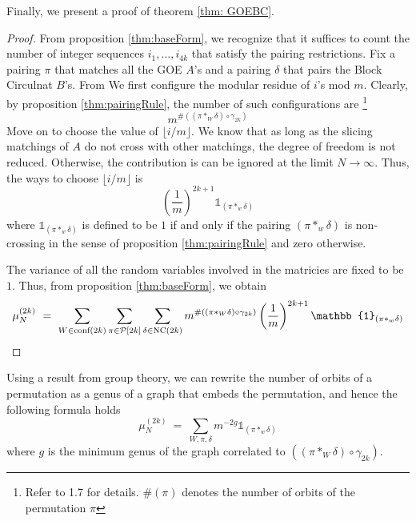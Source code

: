 \documentclass[12pt,reqno]{amsart}
\theoremstyle{plain} %
\theoremstyle{remark}
\theoremstyle{definition}
\begin{document}
Finally, we present a proof of theorem \ref{thm: GOEBC}.
\begin{proof} 
    From proposition \ref{thm:baseForm}, we recognize that 
    it suffices to count the number of integer sequences 
    $i_1, \dots, i_{4k}$ that satisfy the pairing restrictions. 
    Fix a pairing $\pi$ that matches all the GOE $A$'s and a
    pairing $\delta$  that pairs the Block Circulnat $B$'s. 
    From 
    We first configure the modular residue of $i$'s mod $m$. 
    Clearly, by proposition \ref{thm:pairingRule}, the number of such configurations are \footnote{Refer to \cite{MS} 1.7 for details. $\#(\pi)$ denotes the number of orbits of the permutation $\pi$} 
    \[
    m^{
        \# ((\pi *_W \delta)\circ \gamma_{2k})
    }
    \]
    Move on to 
    choose the value of $\lfloor i / m \rfloor$. 
    We know that as long as the slicing matchings of $A$ do 
    not cross with other matchings, the degree of freedom 
    is not reduced. Otherwise, the contribution is can be ignored 
    at the limit $N \rightarrow \infty$. Thus, the ways to choose 
$\lfloor i / m \rfloor$ is 
\begin{equation}
        \left(
            \frac 1 m
        \right)^{2k + 1}
        \mathbb{1}_{(\pi*_w\delta)}
\end{equation}
where $\mathbb{1}_{(\pi*_w\delta)}$ is defined to be $1$ if and only if 
the pairing $(\pi*_w\delta)$ is non-crossing in the sense of proposition 
\ref{thm:pairingRule} and zero otherwise. 

The variance of all the random variables involved in the matricies are 
fixed to be $1$. Thus, from proposition \ref{thm:baseForm}, we obtain 
\label{thm: GOEBC}
    \begin{equation}
        \mu_N^{(2k)} \ = \ 
        \sum_{W \in \PW(2k)}
        \sum_{\pi \in \mathcal P[2k]}  
        \sum_{\delta \in \NC(2k)}   
        m^{
            \#((\pi *_W \delta) \circ \gamma_{2k} )
        }
        \left(
            \frac 1 m
        \right)^{2k + 1}
        \mathbb{1}_{(\pi*_w\delta)}
    \end{equation}
\end{proof}

\begin{remark}
    Using a result from group theory, we can rewrite the number of orbits of 
    a permutation as a genus of a graph that embeds the permutation, and hence 
    the following formula holds
    \begin{equation}
    \mu_N^{(2k)} \ = \ 
        \sum_{W, \pi, \delta} m^{-2g} \mathbb{1}_{(\pi*_w\delta)}
    \end{equation}
    where $g$ is the minimum genus of the graph correlated to 
    $((\pi *_W \delta) \circ \gamma_{2k} )$. 
\end{remark}
\end{document}
